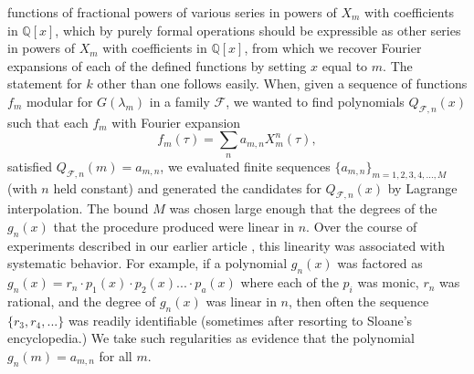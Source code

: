 \documentclass{article}
\begin{document}
functions of fractional powers
of various series in
powers of $X_m$ with coefficients
in $\mathbb{Q}[x]$,
which by purely formal operations
should be expressible as other
series in powers of $X_m$ with
coefficients in $\mathbb{Q}[x]$,
from which we 
recover Fourier expansions of 
each of the defined functions
by setting $x$ equal to $m$.
The statement for $k$ other
than one follows easily.
\newline \newline \noindent
When, given  a sequence of functions
$f_m$ modular for  $G(\lambda_m)$ 
in a family $\mathcal{F}$,
we wanted to find polynomials
$Q_{\mathcal{F},n}(x)$
such that each $f_m$
with Fourier expansion
$$
f_m(\tau) = \sum_n  a_{m,n} X_m^n(\tau),
$$
satisfied $Q_{\mathcal{F},n}(m) = a_{m,n}$,
we evaluated
finite sequences
$\{a_{m,n}\}_{m = 1, 2, 3, 4, ...,M}$
 (with $n$ held constant)
and generated the candidates
for $Q_{\mathcal{F},n}(x)$
by Lagrange interpolation.
The bound $M$ was 
chosen large enough that
the degrees of the $g_n(x)$
that the procedure produced were
linear in $n$.
Over the
course of experiments described in
our earlier article \cite{interpolating}, 
this linearity 
was associated with systematic behavior.
For example, if a polynomial $g_n(x)$
was factored as 
$g_n(x) = 
r_n\cdot p_1(x) \cdot p_2(x)...\cdot p_a(x)$
where each of the $p_i$ was monic, $r_n$
was rational, and the degree of $g_n(x)$
was linear in $n$, then often the sequence
$\{r_3, r_4, ...\}$ was readily identifiable
(sometimes after resorting to Sloane's
encyclopedia.) We take such regularities
as evidence that the polynomial $g_n(m) =
a_{m,n}$ for all $m$.
\end{document}
